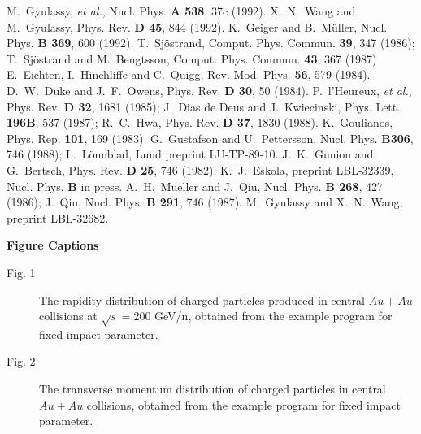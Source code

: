 \begin{thebibliography}{99}
 M.~Gyulassy, {\em et al.}, Nucl. Phys. {\bf A 538}, 37c (1992).
 X.~N.~Wang and M.~Gyulassy, Phys. Rev. {\bf D 45},
        844 (1992).
 K.~Geiger and B.~M\"{u}ller, Nucl. Phys. {\bf B 369},
        600 (1992).
 T.~Sj\"{o}strand, Comput. Phys. Commun. {\bf 39}, 347 (1986);
        T.~Sj\"{o}strand and M.~Bengtsson, Comput. Phys. Commun.
        {\bf 43}, 367 (1987)
 E.~Eichten, I.~Hinchliffe and C.~Quigg, Rev. Mod. Phys.
        {\bf 56}, 579 (1984).
 D.~W.~Duke and J.~F.~Owens, Phys. Rev. {\bf D 30}, 50 (1984).
 P.~l'Heureux, {\em et al.}, Phys. Rev. {\bf D 32},
         1681 (1985); J.~Dias de Deus and J.~Kwiecinski, Phys. Lett. 
        {\bf 196B}, 537 (1987); R.~C.~Hwa, Phys. Rev. {\bf D 37}, 1830 (1988).
 K.~Goulianos, Phys. Rep. {\bf 101}, 169 (1983).
 G.~Gustafson and U.~Pettersson, Nucl. Phys. {\bf B306},
        746 (1988); L.~L\"{o}nnblad, Lund preprint LU-TP-89-10.
 J.~K.~Gunion and G.~Bertsch, Phys. Rev. {\bf D 25}, 
        746 (1982).
 K.~J.~Eskola, preprint LBL-32339, 
        Nucl. Phys. {\bf B} in press.
 A.~H.~Mueller and J.~Qiu, Nucl. Phys. {\bf B 268}, 
        427 (1986); J.~Qiu, Nucl. Phys. {\bf B 291}, 746 (1987). 
 M.~Gyulassy and X.~N.~Wang, preprint LBL-32682.


\end{thebibliography}


\pagebreak

{\noindent\Large\bf Figure Captions}
\vspace{24pt}
\begin{description}

\item[Fig. 1] The rapidity distribution of charged particles produced in
              central $Au+Au$ collisions at $\sqrt{s}=200$ GeV/n, obtained
              from the example program for fixed impact parameter.

\item[Fig. 2] The transverse momentum distribution of charged particles
              in central $Au+Au$ collisions, obtained from the example 
              program for fixed impact parameter.

\end{description}





                                    
 
